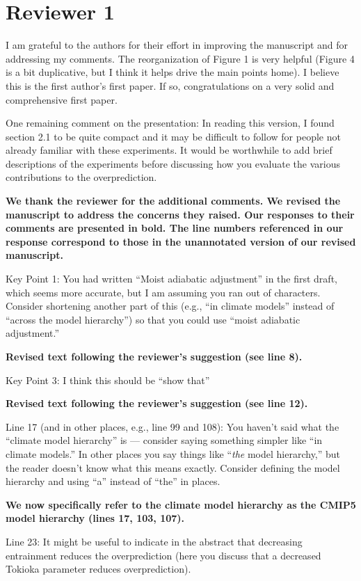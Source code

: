 \documentclass[11pt]{article}
\date{}
\title{}
\begin{document}
\section*{Reviewer 1}
\label{sec:org6394099}
I am grateful to the authors for their effort in improving the manuscript and for addressing my comments. The reorganization of Figure 1 is very helpful (Figure 4 is a bit duplicative, but I think it helps drive the main points home). I believe this is the first author's first paper. If so, congratulations on a very solid and comprehensive first paper.

One remaining comment on the presentation: In reading this version, I found section 2.1 to be quite compact and it may be difficult to follow for people not already familiar with these experiments. It would be worthwhile to add brief descriptions of the experiments before discussing how you evaluate the various contributions to the overprediction.

\textbf{We thank the reviewer for the additional comments. We revised the manuscript to address the concerns they raised. Our responses to their comments are presented in bold. The line numbers referenced in our response correspond to those in the unannotated version of our revised manuscript.}

Key Point 1: You had written ``Moist adiabatic adjustment'' in the first draft, which seems more accurate, but I am assuming you ran out of characters. Consider shortening another part of this (e.g., ``in climate models'' instead of ``across the model hierarchy'') so that you could use ``moist adiabatic adjustment.''

\textbf{Revised text following the reviewer's suggestion (see line 8).}

Key Point 3: I think this should be ``show that''

\textbf{Revised text following the reviewer's suggestion (see line 12).}

Line 17 (and in other places, e.g., line 99 and 108): You haven't said what the ``climate model hierarchy'' is --- consider saying something simpler like ``in climate models.'' In other places you say things like ``\emph{the} model hierarchy,'' but the reader doesn't know what this means exactly. Consider defining the model hierarchy and using ``a'' instead of ``the'' in places.

\textbf{We now specifically refer to the climate model hierarchy as the CMIP5 model hierarchy (lines 17, 103, 107).}

Line 23: It might be useful to indicate in the abstract that decreasing entrainment reduces the overprediction (here you discuss that a decreased Tokioka parameter reduces overprediction).
\end{document}
